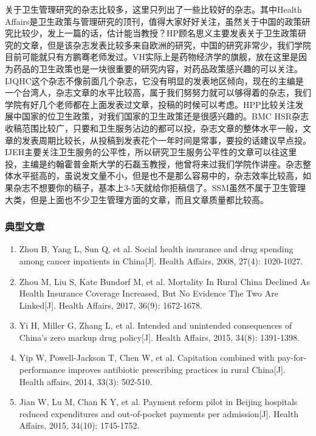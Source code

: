 \documentclass[11pt, a4paper]{article}
\begin{document}
关于卫生管理研究的杂志比较多，这里只列出了一些比较好的杂志。其中Health Affairs是卫生政策与管理研究的顶刊，值得大家好好关注，虽然关于中国的政策研究比较少，发上一篇的话，估计能当教授？HP顾名思义主要发表关于卫生政策研究的文章，但是该杂志发表比较多来自欧洲的研究，中国的研究非常少，我们学院目前可能就只有方鹏骞老师发过。VH实际上是药物经济学的旗舰，放在这里是因为药品的卫生政策也是一块很重要的研究内容，对药品政策感兴趣的可以关注。IJQHC这个杂志不像前面几个杂志，它没有明显的发表地区倾向，现在的主编是一个台湾人，杂志文章的水平比较高，属于我们努努力就可以够得着的杂志，我们学院有好几个老师都在上面发表过文章，投稿的时候可以考虑。HPP比较关注发展中国家的位卫生政策，对我们国家的卫生政策还是很感兴趣的。BMC HSR杂志收稿范围比较广，只要和卫生服务沾边的都可以投，杂志文章的整体水平一般，文章的发表周期比较长，从投稿到发表花个一年时间是常事，要投的话建议早点投。IJEH主要关注卫生服务的公平性，所以研究卫生服务公平性的文章可以往这里投，主编是约翰霍普金斯大学的石磊玉教授，他曾将来过我们学院作讲座。杂志整体水平挺高的，虽说发文量不小，但是也不是那么容易中的，杂志效率比较高，如果杂志不想要你的稿子，基本上3-5天就给你拒稿信了。SSM虽然不属于卫生管理大类，但是上面也不少卫生管理方面的文章，而且文章质量都比较高。

\subsubsection{典型文章}

\begin{enumerate}[(1)]
	\item Zhou B, Yang L, Sun Q, et al. Social health insurance and drug spending among cancer inpatients in China[J]. Health Affairs, 2008, 27(4): 1020-1027.
	\item Zhou M, Liu S, Kate Bundorf M, et al. Mortality In Rural China Declined As Health Insurance Coverage Increased, But No Evidence The Two Are Linked[J]. Health Affairs, 2017, 36(9): 1672-1678.
	\item Yi H, Miller G, Zhang L, et al. Intended and unintended consequences of China’s zero markup drug policy[J]. Health Affairs, 2015, 34(8): 1391-1398.
	\item Yip W, Powell-Jackson T, Chen W, et al. Capitation combined with pay-for-performance improves antibiotic prescribing practices in rural China[J]. Health affairs, 2014, 33(3): 502-510.
	\item Jian W, Lu M, Chan K Y, et al. Payment reform pilot in Beijing hospitals reduced expenditures and out-of-pocket payments per admission[J]. Health Affairs, 2015, 34(10): 1745-1752.	
\end{enumerate}
\end{document}
